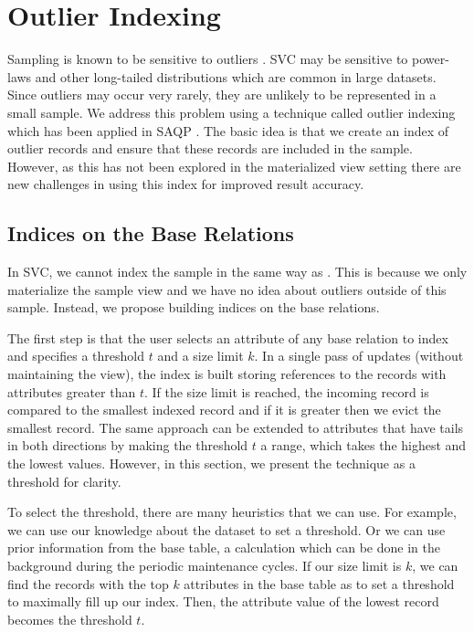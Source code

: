 \section{Outlier Indexing}\label{outlier}
Sampling is known to be sensitive to outliers \cite{clauset2009power, chaudhuri2001overcoming}.
SVC may be sensitive to power-laws and other long-tailed distributions which are common in large datasets\cite{clauset2009power}.
Since outliers may occur very rarely, they are unlikely to be represented in a small sample. 
We address this problem using a technique called outlier indexing which has been applied in SAQP \cite{chaudhuri2001overcoming}.
The basic idea is that we create an index of outlier records and ensure that these records are included in the sample.
However, as this has not been explored in the materialized view setting there are new challenges in using this index for improved result accuracy.

\subsection{Indices on the Base Relations}
In SVC, we cannot index the sample in the same way as \cite{chaudhuri2001overcoming}. 
This is because we only materialize the sample view and we have no idea about outliers outside of this sample.
Instead, we propose building indices on the base relations.

The first step is that the user selects an attribute of any base relation to index and specifies a threshold $t$ and a size limit $k$.
In a single pass of updates (without maintaining the view), the index is built storing references to the records with attributes greater than $t$.
If the size limit is reached, the incoming record is compared to the smallest indexed record and if it is greater then we evict the smallest record.
The same approach can be extended to attributes that have tails in both directions by making the threshold $t$ a range, which takes the highest and the lowest values.
However, in this section, we present the technique as a threshold for clarity.

To select the threshold, there are many heuristics that we can use.
For example, we can use our knowledge about the dataset to set a threshold.
Or we can use prior information from the base table, a calculation which can be done in the background during the periodic maintenance cycles.
If our size limit is $k$, we can find the records with the top $k$ attributes in the base table as to set a threshold to maximally fill up our index. 
Then, the attribute value of the lowest record becomes the threshold $t$.

